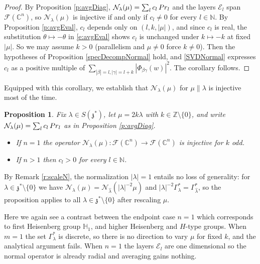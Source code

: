 \documentclass[11pt]{amsart}
\theoremstyle{plain}
\newtheorem{proposition}[theorem]{Proposition}
\theoremstyle{definition}
\theoremstyle{remark}
\numberwithin{equation}{section}
\def\fz{\mathfrak{z}}
\def\cE{\mathcal{E}}
\def\cN{\mathcal{N}}
\def\cF{\mathcal{F}}
\def\mz{\setminus\{0\}}
\def\C{{\mathbb C}}%
\def\N{{\mathbb N}}%
\def\Z{{\mathbb Z}}%
\def \heis {\mathbb{H}}
\numberwithin{equation}{section}
\begin{document}
\begin{proof}
	By Proposition \ref{p:avgDiag}, $\cN_\lambda(\mu)=\sum_l c_l\,{\rm Pr}_l$ and the layers $\cE_l$ span $\cF(\C^n)$, so $\cN_\lambda(\mu)$ is injective if and only if $c_l\neq 0$ for every $l\in \N$. By Proposition \ref{p:avgEval}, $c_l$ depends only on $(l, k, |\mu|)$, and since $c_l$ is real, the substitution $\theta\mapsto-\theta$ in \eqref{e:avgEval} shows $c_l$ is unchanged under $k\mapsto-k$ at fixed $|\mu|$. So we may assume $k>0$ (parallelism and $\mu\neq0$ force $k\neq0$). Then the hypotheses of Proposition \ref{specDecompNormal} hold, and \eqref{SVDNormal} expresses $c_l$ as a positive multiple of $\sum_{|\beta|=l, |\gamma|=l+k}|\Phi_{\beta\gamma}(w)|^2$. The corollary follows.
\end{proof}
Equipped with this corollary, we establish that $\cN_\lambda(\mu)$ for $\mu\parallel\lambda$ is injective most of the time.
\begin{proposition}\label{oddInteger}
	Fix $\lambda\in S(\fz^*)$, let $\mu=2k\lambda$ with $k\in \Z\mz$, and write $\cN_\lambda(\mu)=\sum_l c_l\,{\rm Pr}_l$ as in Proposition \ref{p:avgDiag}.
	\begin{itemize}
		\item[(a)] If $n =1$ the operator $\cN_\lambda(\mu):\cF(\C^n)\to \cF(\C^n)$ is injective for $k$ odd.
		\item[(b)] If $n>1$ then $c_l>0$ for every $l\in \N$.
	\end{itemize}
\end{proposition}
By Remark \ref{r:scaleN}, the normalization $|\lambda|=1$ entails no loss of generality: for $\lambda\in \fz^*\mz$ we have $\cN_\lambda(\mu)=\cN_{\hat\lambda}(|\lambda|^{-2}\mu)$ and $|\lambda|^{-2}\Gamma_\lambda^*=\Gamma_{\hat\lambda}^*$, so the proposition applies to all $\lambda\in \fz^*\mz$ after rescaling $\mu$.

Here we again see a contrast between the endpoint case $n=1$ which corresponds to first Heisenberg group $\heis_1$,  and higher Heisenberg and $H$-type groups. When $m=1$ the set $\Gamma_\lambda^*$ is discrete, so there is no direction to vary $\mu$ for fixed $k$, and the analytical argument fails. When $n=1$ the layers $\cE_l$ are one dimensional so the normal operator is already radial and averaging gains nothing. 
\end{document}
